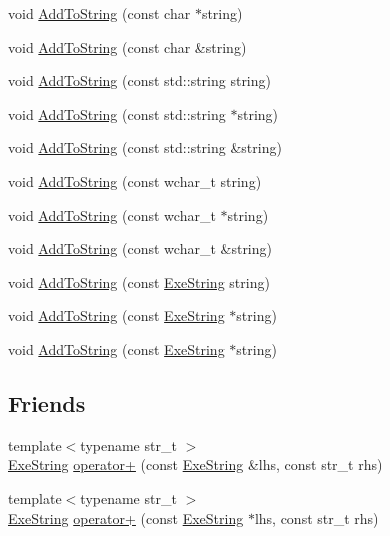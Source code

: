\begin{DoxyCompactItemize}
\item 
void \hyperlink{class_tri_1_1_util_1_1_exe_string_a183d4b7bf044a6f8996358fd14bc33d8}{Add\+To\+String} (const char $\ast$string)
\item 
void \hyperlink{class_tri_1_1_util_1_1_exe_string_a61b9b629f1ab67e64eba72244b20c8ed}{Add\+To\+String} (const char \&string)
\item 
void \hyperlink{class_tri_1_1_util_1_1_exe_string_a95bacbd03101e1aeca32fcd8aab33809}{Add\+To\+String} (const std\+::string string)
\item 
void \hyperlink{class_tri_1_1_util_1_1_exe_string_a29af37307be8870f27537e2d112f70fe}{Add\+To\+String} (const std\+::string $\ast$string)
\item 
void \hyperlink{class_tri_1_1_util_1_1_exe_string_a763314fbba2b83f286c204be6b26ec43}{Add\+To\+String} (const std\+::string \&string)
\item 
void \hyperlink{class_tri_1_1_util_1_1_exe_string_afb3e1f7f0f415501dbab9a165d40c0b4}{Add\+To\+String} (const wchar\+\_\+t string)
\item 
void \hyperlink{class_tri_1_1_util_1_1_exe_string_a94c16f181c6d8f9047993f8fdcc3cc73}{Add\+To\+String} (const wchar\+\_\+t $\ast$string)
\item 
void \hyperlink{class_tri_1_1_util_1_1_exe_string_a67598806ed24e724fdf46f1044419bc3}{Add\+To\+String} (const wchar\+\_\+t \&string)
\item 
void \hyperlink{class_tri_1_1_util_1_1_exe_string_a129480edb4b24872c2aa9f1183b91bac}{Add\+To\+String} (const \hyperlink{class_tri_1_1_util_1_1_exe_string}{Exe\+String} string)
\item 
void \hyperlink{class_tri_1_1_util_1_1_exe_string_a436a197a9e1b2ab4911b771612c6c39d}{Add\+To\+String} (const \hyperlink{class_tri_1_1_util_1_1_exe_string}{Exe\+String} $\ast$string)
\item 
void \hyperlink{class_tri_1_1_util_1_1_exe_string_a436a197a9e1b2ab4911b771612c6c39d}{Add\+To\+String} (const \hyperlink{class_tri_1_1_util_1_1_exe_string}{Exe\+String} $\ast$string)
\end{DoxyCompactItemize}
\subsection*{Friends}
\begin{DoxyCompactItemize}
\item 
{\footnotesize template$<$typename str\+\_\+t $>$ }\\\hyperlink{class_tri_1_1_util_1_1_exe_string}{Exe\+String} \hyperlink{class_tri_1_1_util_1_1_exe_string_a39806d6e0c1844d9e262b196034caafb}{operator+} (const \hyperlink{class_tri_1_1_util_1_1_exe_string}{Exe\+String} \&lhs, const str\+\_\+t rhs)
\item 
{\footnotesize template$<$typename str\+\_\+t $>$ }\\\hyperlink{class_tri_1_1_util_1_1_exe_string}{Exe\+String} \hyperlink{class_tri_1_1_util_1_1_exe_string_ac94b1281e2ba4a38327d8f096009d1e7}{operator+} (const \hyperlink{class_tri_1_1_util_1_1_exe_string}{Exe\+String} $\ast$lhs, const str\+\_\+t rhs)
\end{DoxyCompactItemize}


